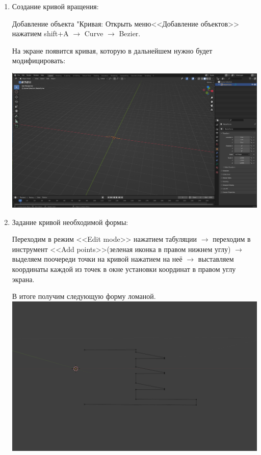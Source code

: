 \documentclass[12pt]{article}
\begin{document}
\begin{enumerate}

\item Создание кривой вращения:

Добавление объекта "Кривая: 
Открыть меню<<Добавление объектов>> нажатием shift+A   $\to $  Curve  $\to $ Bezier.

На экране появится кривая, которую в дальнейшем нужно будет модифицировать:


\vskip 1cm
{
    \centering
    \includegraphics[width=1\linewidth]{кривая1.png}
    \label{fig:i1}
}
\vskip 1cm


\item Задание кривой необходимой формы:

Переходим в режим <<Edit mode>> нажатием табуляции  $\to $   переходим в инструмент <<Add points>>(зеленая иконка в правом нижнем углу)  $\to $ выделяем поочереди точки на кривой нажатием на неё $\to $ выставляем координаты каждой из точек в окне установки координат в правом углу экрана.

В итоге получим следующую форму ломаной.
\vskip 1cm
{
    \centering
    \includegraphics[width=1\linewidth]{форма1.png}
    \label{fig:i1}
}
\vskip 1cm



\end{enumerate}
\end{document}
